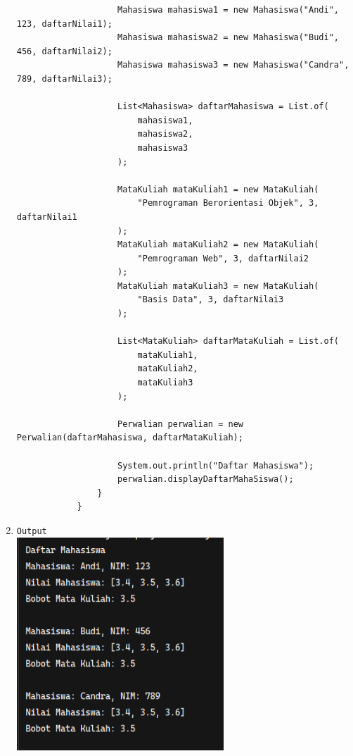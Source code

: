 \documentclass[12pt,titlepage]{article}
\begin{document}
\begin{enumerate}
{\begin{verbatim}
                    Mahasiswa mahasiswa1 = new Mahasiswa("Andi", 123, daftarNilai1);
                    Mahasiswa mahasiswa2 = new Mahasiswa("Budi", 456, daftarNilai2);
                    Mahasiswa mahasiswa3 = new Mahasiswa("Candra", 789, daftarNilai3);

                    List<Mahasiswa> daftarMahasiswa = List.of(
                        mahasiswa1,
                        mahasiswa2,
                        mahasiswa3
                    );

                    MataKuliah mataKuliah1 = new MataKuliah(
                        "Pemrograman Berorientasi Objek", 3, daftarNilai1
                    );
                    MataKuliah mataKuliah2 = new MataKuliah(
                        "Pemrograman Web", 3, daftarNilai2
                    );
                    MataKuliah mataKuliah3 = new MataKuliah(
                        "Basis Data", 3, daftarNilai3
                    );

                    List<MataKuliah> daftarMataKuliah = List.of(
                        mataKuliah1,
                        mataKuliah2,
                        mataKuliah3
                    );

                    Perwalian perwalian = new Perwalian(daftarMahasiswa, daftarMataKuliah);

                    System.out.println("Daftar Mahasiswa");
                    perwalian.displayDaftarMahaSiswa();
                }
            }
        \end{verbatim}
    }
    \pagebreak
    \item {
        \texttt{Output}\\
        \includegraphics[height=8cm]{./images/output.png}
    }
\end{enumerate}
\end{document}
